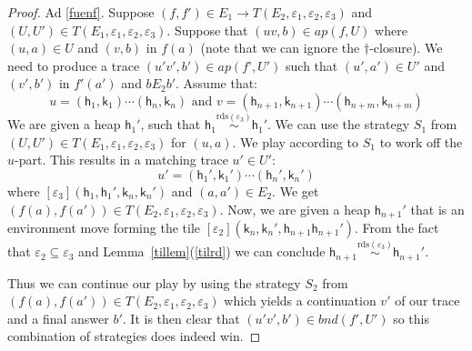 \documentclass[nocopyrightspace,preprint]{sigplanconf}
\newcommand{\eff}{\varepsilon}
\newcommand{\reads}{\mathrm{rds}}
\newcommand{\rds}{\reads}
\newcommand\heap{\ensuremath{\mathsf{h}}\xspace}
\newcommand\h{\heap}
\renewcommand\k{\ensuremath{\mathsf{k}}\xspace}
\newcommand\rloc[3]{\ensuremath{#1 \stackrel{#3}{\sim} #2}}
\begin{document}
\begin{proof}
Ad \ref{fuenf}. Suppose 
$(f,f')\in E_1{\rightarrow} T(E_2,\eff_1,\eff_2,\eff_3)$ and $(U,U')\in T(E_1,\eff_1,\eff_2,\eff_3)$. Suppose that $(uv,b)\in ap(\textit{f},{U})$ where $(u,a)\in U$ and $(v,b)$ in $f(a)$ (note that we can ignore the $\dagger$-closure). We need to produce a trace $(u'v',b') \in ap(\textit{f'},{U'})$ such that $(u',a')\in U'$ and $(v',b')$ in $f'(a')$ and $b E_2 b'$. Assume that:
\[
  u = (\h_1,\k_1) \cdots (\h_n,\k_n) \textrm{ and } v = (\h_{n+1},\k_{n+1}) \cdots (\h_{n+m},\k_{n+m})
\]
We are given a heap $\h_1'$, such that $\rloc{\h_1}{\h_1'}{\rds(\eff_3)}$. We can use the strategy $S_1$ from $(U,U')\in T(E_1,\eff_1,\eff_2,\eff_3)$ for $(u,a)$. We play according to $S_1$ to work off the $u$-part. This results in a matching trace $u' \in U'$:
\[
    u' = (\h_1',\k_1') \cdots (\h_n',\k_n')
\]
where $[\eff_3](\h_1,\h_1',\k_n,\k_n')$ and $(a,a')\in E_2$. 
We get $(f(a),f(a'))\in T(E_2,\eff_1,\eff_2,\eff_3)$. Now, we are given a heap $\h_{n+1}'$ that is an environment move forming the tile $[\eff_2](\k_n,\k_n',\h_{n+1}\h_{n+1}')$. From the fact that $\eff_2 \subseteq \eff_3$ and Lemma~\ref{tillem}(\ref{tilrd}) we can conclude $\rloc{\h_{n+1}}{\h_{n+1}'}{\rds(\eff_3)}$. 



Thus we can continue our play by using the strategy $S_2$ from
$(f(a),f(a'))\in T(E_2,\eff_1,\eff_2,\eff_3)$ which yields a
continuation $v'$ of our trace and a final answer $b'$. It is then
clear that $(u'v',b')\in \textit{bnd}(f',U')$ so this combination of
strategies does indeed win.



\medskip 


\end{proof}
\end{document}
